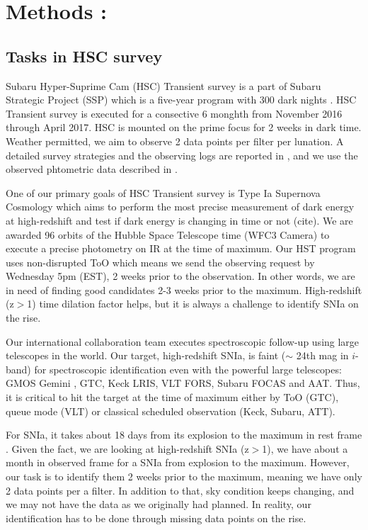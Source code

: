 \documentclass[useamsfonts]{pasj01}
\begin{document}
\section{Methods :}
\subsection{Tasks in HSC survey}
\label{sec:tasks}
Subaru Hyper-Suprime Cam (HSC) Transient survey is a part of Subaru Strategic Project (SSP) which is a five-year program with 300 dark nights \citep{aihara18a,miyazaki18a}.
HSC Transient survey is executed for a consective 6 monghth from November 2016 through April 2017.
HSC is mounted on the prime focus for 2 weeks in dark time.   
Weather permitted, we aim to observe 2 data points per filter per lunation.
A detailed survey strategies and the observing logs are reported in \citet{yasuda19a}, and we use the observed phtometric data described in \citet{yasuda19a}.

One of our primary goals of HSC Transient survey is Type Ia Supernova Cosmology which aims to perform the most precise measurement of dark energy at high-redshift and test if dark energy is changing in time or not (cite).
We are awarded 96 orbits of the Hubble Space Telescope time (WFC3 Camera) to execute a precise photometry on IR at the time of maximum.
Our HST program uses non-disrupted ToO which means we send the observing request by Wednesday 5pm (EST), 2 weeks prior to the observation.
In other words, we are in need of finding good candidates 2-3 weeks prior to the maximum.  High-redshift (z$>$1) time dilation factor helps, but it is always a challenge to identify SNIa on the rise.

Our international collaboration team executes spectroscopic follow-up using large telescopes in the world.  
Our target, high-redshift SNIa, is faint ($\sim$ 24th mag in $i$-band) for spectroscopic identification even with the powerful large telescopes: GMOS Gemini \citep{hook04a}, GTC, Keck LRIS, VLT FORS, Subaru FOCAS \citep{kashikawa02a} and AAT.  
Thus, it is critical to hit the target at the time of maximum either by ToO (GTC), queue mode (VLT) or classical scheduled observation (Keck, Subaru, ATT).

For SNIa, it takes about 18 days from its explosion to the maximum in rest frame \citep{conley06a,papadogiannakis19a}.   Given the fact, we are looking at high-redshift SNIa (z$>$1), we have about a month in observed frame for a SNIa from explosion to the maximum.   However, our task is to identify them 2 weeks prior to the maximum, meaning we have only 2 data points per a filter.   In addition to that, sky condition keeps changing, and we may not have the data as we originally had planned.   In reality, our identification has to be done through missing data points on the rise.
\end{document}
